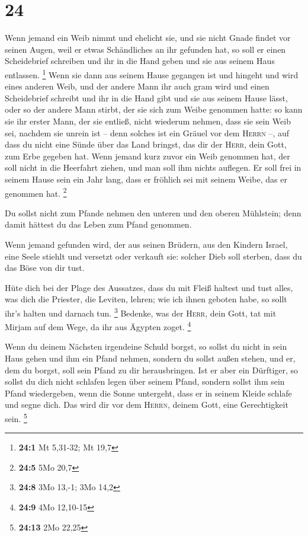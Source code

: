 \hypertarget{section-5}{%
\section{24}\label{section-5}}

 Wenn jemand ein Weib nimmt und ehelicht sie, und sie
nicht Gnade findet vor seinen Augen, weil er etwas Schändliches an ihr
gefunden hat, so soll er einen Scheidebrief schreiben und ihr in die
Hand geben und sie aus seinem Haus entlassen. \footnote{\textbf{24:1} Mt
  5,31-32; Mt 19,7}  Wenn sie dann aus seinem Hause
gegangen ist und hingeht und wird eines anderen Weib,  und
der andere Mann ihr auch gram wird und einen Scheidebrief schreibt und
ihr in die Hand gibt und sie aus seinem Hause lässt, oder so der andere
Mann stirbt, der sie sich zum Weibe genommen hatte:  so
kann sie ihr erster Mann, der sie entließ, nicht wiederum nehmen, dass
sie sein Weib sei, nachdem sie unrein ist -- denn solches ist ein Gräuel
vor dem \textsc{Herrn} --, auf dass du nicht eine Sünde über das Land
bringst, das dir der \textsc{Herr}, dein Gott, zum Erbe gegeben hat.
 Wenn jemand kurz zuvor ein Weib genommen hat, der soll
nicht in die Heerfahrt ziehen, und man soll ihm nichts auflegen. Er soll
frei in seinem Hause sein ein Jahr lang, dass er fröhlich sei mit seinem
Weibe, das er genommen hat. \footnote{\textbf{24:5} 5Mo 20,7}

 Du sollst nicht zum Pfande nehmen den unteren und den
oberen Mühlstein; denn damit hättest du das Leben zum Pfand genommen.

 Wenn jemand gefunden wird, der aus seinen Brüdern, aus
den Kindern Israel, eine Seele stiehlt und versetzt oder verkauft sie:
solcher Dieb soll sterben, dass du das Böse von dir tust.

 Hüte dich bei der Plage des Aussatzes, dass du mit Fleiß
haltest und tust alles, was dich die Priester, die Leviten, lehren; wie
ich ihnen geboten habe, so sollt ihr's halten und darnach tun.
\footnote{\textbf{24:8} 3Mo 13,-1; 3Mo 14,2}  Bedenke, was
der \textsc{Herr}, dein Gott, tat mit Mirjam auf dem Wege, da ihr aus
Ägypten zoget. \footnote{\textbf{24:9} 4Mo 12,10-15}

 Wenn du deinem Nächsten irgendeine Schuld borgst, so
sollst du nicht in sein Haus gehen und ihm ein Pfand nehmen,
 sondern du sollst außen stehen, und er, dem du borgst,
soll sein Pfand zu dir herausbringen.  Ist er aber ein
Dürftiger, so sollst du dich nicht schlafen legen über seinem Pfand,
 sondern sollst ihm sein Pfand wiedergeben, wenn die
Sonne untergeht, dass er in seinem Kleide schlafe und segne dich. Das
wird dir vor dem \textsc{Herrn}, deinem Gott, eine Gerechtigkeit sein.
\footnote{\textbf{24:13} 2Mo 22,25}

